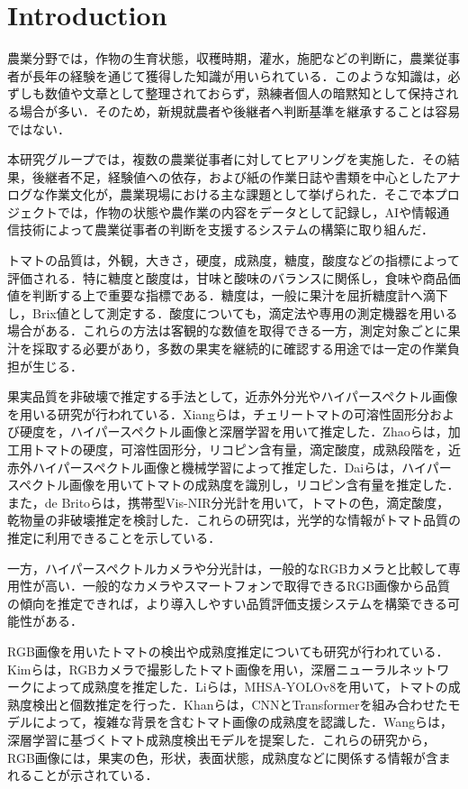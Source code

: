 \documentclass[authorproof,JRM,paper]{fujipressarticle}
\begin{document}
\section{Introduction}

農業分野では，作物の生育状態，収穫時期，灌水，施肥などの判断に，農業従事者が長年の経験を通じて獲得した知識が用いられている．このような知識は，必ずしも数値や文章として整理されておらず，熟練者個人の暗黙知として保持される場合が多い．そのため，新規就農者や後継者へ判断基準を継承することは容易ではない．

本研究グループでは，複数の農業従事者に対してヒアリングを実施した．その結果，後継者不足，経験値への依存，および紙の作業日誌や書類を中心としたアナログな作業文化が，農業現場における主な課題として挙げられた．そこで本プロジェクトでは，作物の状態や農作業の内容をデータとして記録し，AIや情報通信技術によって農業従事者の判断を支援するシステムの構築に取り組んだ．

トマトの品質は，外観，大きさ，硬度，成熟度，糖度，酸度などの指標によって評価される．特に糖度と酸度は，甘味と酸味のバランスに関係し，食味や商品価値を判断する上で重要な指標である．糖度は，一般に果汁を屈折糖度計へ滴下し，Brix値として測定する．酸度についても，滴定法や専用の測定機器を用いる場合がある．これらの方法は客観的な数値を取得できる一方，測定対象ごとに果汁を採取する必要があり，多数の果実を継続的に確認する用途では一定の作業負担が生じる．

果実品質を非破壊で推定する手法として，近赤外分光やハイパースペクトル画像を用いる研究が行われている．Xiangらは，チェリートマトの可溶性固形分および硬度を，ハイパースペクトル画像と深層学習を用いて推定した\cite{xiang2022deep}．Zhaoらは，加工用トマトの硬度，可溶性固形分，リコピン含有量，滴定酸度，成熟段階を，近赤外ハイパースペクトル画像と機械学習によって推定した\cite{zhao2023determination}．Daiらは，ハイパースペクトル画像を用いてトマトの成熟度を識別し，リコピン含有量を推定した\cite{dai2023application}．また，de Britoらは，携帯型Vis-NIR分光計を用いて，トマトの色，滴定酸度，乾物量の非破壊推定を検討した\cite{debrito2022non}．これらの研究は，光学的な情報がトマト品質の推定に利用できることを示している．

一方，ハイパースペクトルカメラや分光計は，一般的なRGBカメラと比較して専用性が高い．一般的なカメラやスマートフォンで取得できるRGB画像から品質の傾向を推定できれば，より導入しやすい品質評価支援システムを構築できる可能性がある．

RGB画像を用いたトマトの検出や成熟度推定についても研究が行われている．Kimらは，RGBカメラで撮影したトマト画像を用い，深層ニューラルネットワークによって成熟度を推定した\cite{kim2023tomato}．Liらは，MHSA-YOLOv8を用いて，トマトの成熟度検出と個数推定を行った\cite{li2023tomato}．Khanらは，CNNとTransformerを組み合わせたモデルによって，複雑な背景を含むトマト画像の成熟度を認識した\cite{khan2023tomato}．Wangらは，深層学習に基づくトマト成熟度検出モデルを提案した\cite{wang2024method}．これらの研究から，RGB画像には，果実の色，形状，表面状態，成熟度などに関係する情報が含まれることが示されている．
\end{document}
